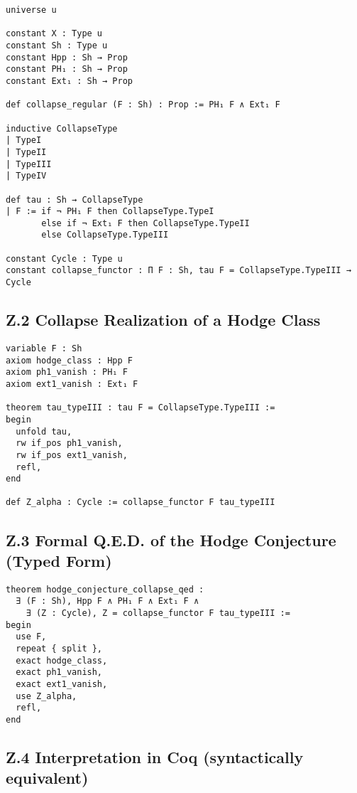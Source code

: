 \documentclass[11pt]{article}
\begin{document}
\begin{lstlisting}[language=Lean, caption=Lean Formalization of Collapse Typing]
universe u

constant X : Type u
constant Sh : Type u              
constant Hpp : Sh → Prop          
constant PH₁ : Sh → Prop          
constant Ext₁ : Sh → Prop         

def collapse_regular (F : Sh) : Prop := PH₁ F ∧ Ext₁ F

inductive CollapseType
| TypeI
| TypeII
| TypeIII
| TypeIV

def tau : Sh → CollapseType
| F := if ¬ PH₁ F then CollapseType.TypeI
       else if ¬ Ext₁ F then CollapseType.TypeII
       else CollapseType.TypeIII

constant Cycle : Type u
constant collapse_functor : Π F : Sh, tau F = CollapseType.TypeIII → Cycle
\end{lstlisting}

\subsection*{Z.2 Collapse Realization of a Hodge Class}

\begin{lstlisting}[language=Lean, caption=Collapse Realization of a Hodge Class]
variable F : Sh
axiom hodge_class : Hpp F
axiom ph1_vanish : PH₁ F
axiom ext1_vanish : Ext₁ F

theorem tau_typeIII : tau F = CollapseType.TypeIII :=
begin
  unfold tau,
  rw if_pos ph1_vanish,
  rw if_pos ext1_vanish,
  refl,
end

def Z_alpha : Cycle := collapse_functor F tau_typeIII
\end{lstlisting}

\subsection*{Z.3 Formal Q.E.D. of the Hodge Conjecture (Typed Form)}

\begin{lstlisting}[language=Lean, caption=Typed QED Theorem in Lean]
theorem hodge_conjecture_collapse_qed :
  ∃ (F : Sh), Hpp F ∧ PH₁ F ∧ Ext₁ F ∧
    ∃ (Z : Cycle), Z = collapse_functor F tau_typeIII :=
begin
  use F,
  repeat { split },
  exact hodge_class,
  exact ph1_vanish,
  exact ext1_vanish,
  use Z_alpha,
  refl,
end
\end{lstlisting}

\subsection*{Z.4 Interpretation in Coq (syntactically equivalent)}
\end{document}
